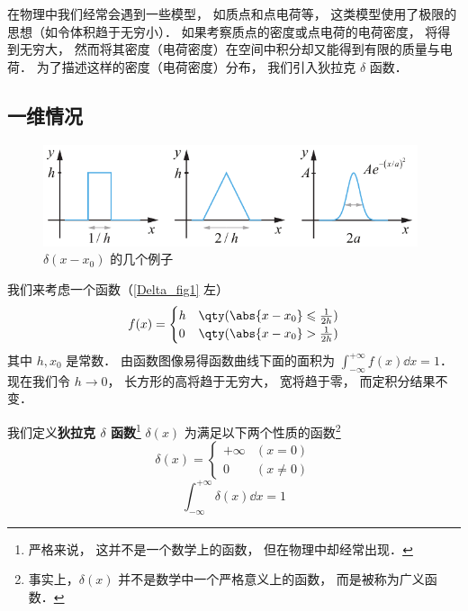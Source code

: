 
在物理中我们经常会遇到一些模型， 如质点和点电荷等， 这类模型使用了极限的思想（如令体积趋于无穷小）． 如果考察质点的密度或点电荷的电荷密度， 将得到无穷大， 然而将其密度（电荷密度）在空间中积分却又能得到有限的质量与电荷． 为了描述这样的密度（电荷密度）分布， 我们引入狄拉克 $\delta$ 函数．

\subsection{一维情况}

\begin{figure}[ht]
\centering
\includegraphics[width=11cm]{./figures/Delta1.pdf}
\caption{$\delta(x - x_0)$ 的几个例子} \label{Delta_fig1}
\end{figure}

我们来考虑一个函数（\autoref{Delta_fig1} 左）
\begin{equation}
f(x) =
\begin{cases}
h & \qty( \abs{x - x_0} \leqslant \frac{1}{2h} )\\
0 & \qty( \abs{x - x_0} > \frac{1}{2h} )
\end{cases}
\end{equation}
其中 $h, x_0$ 是常数． 由函数图像易得函数曲线下面的面积为 $\int_{-\infty}^{+\infty} f(x) \dd{x} = 1$． 现在我们令 $h \to 0$， 长方形的高将趋于无穷大， 宽将趋于零， 而定积分结果不变．

我们定义\textbf{狄拉克 $\delta$ 函数}\footnote{严格来说， 这并不是一个数学上的函数， 但在物理中却经常出现．} $\delta(x)$ 为满足以下两个性质的函数\footnote{事实上，$\delta(x)$ 并不是数学中一个严格意义上的函数， 而是被称为广义函数．}
\begin{equation}\label{Delta_eq2}
\delta(x) =
\begin{cases}
+\infty & (x = 0)\\
0 & (x \ne 0)
\end{cases}
\end{equation}
\begin{equation}\label{Delta_eq3}
\int_{-\infty}^{+\infty} \delta(x) \dd{x} = 1
\end{equation}

